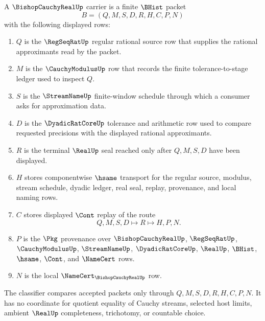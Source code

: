 \begin{definition}
\label{def:bishop-cauchy-real-carrier}
A $\BishopCauchyRealUp$ carrier is a finite $\BHist$ packet
$$
B=(Q,M,S,D,R,H,C,P,N)
$$
with the following displayed rows:
\begin{enumerate}
\item $Q$ is the $\RegSeqRatUp$ regular rational source row that supplies the rational approximants read by the packet.
\item $M$ is the $\CauchyModulusUp$ row that records the finite tolerance-to-stage ledger used to inspect $Q$.
\item $S$ is the $\StreamNameUp$ finite-window schedule through which a consumer asks for approximation data.
\item $D$ is the $\DyadicRatCoreUp$ tolerance and arithmetic row used to compare requested precisions with the displayed rational approximants.
\item $R$ is the terminal $\RealUp$ seal reached only after $Q,M,S,D$ have been displayed.
\item $H$ stores componentwise $\hsame$ transport for the regular source, modulus, stream schedule, dyadic ledger, real seal, replay, provenance, and local naming rows.
\item $C$ stores displayed $\Cont$ replay of the route
$$
Q,M,S,D \longmapsto R \longmapsto H,P,N .
$$
\item $P$ is the $\Pkg$ provenance over $\BishopCauchyRealUp$, $\RegSeqRatUp$, $\CauchyModulusUp$, $\StreamNameUp$, $\DyadicRatCoreUp$, $\RealUp$, $\BHist$, $\hsame$, $\Cont$, and $\NameCert$ rows.
\item $N$ is the local $\NameCert_{\BishopCauchyRealUp}$ row.
\end{enumerate}
The classifier compares accepted packets only through $Q,M,S,D,R,H,C,P,N$. It has no coordinate for quotient equality of Cauchy streams, selected host limits, ambient $\RealUp$ completeness, trichotomy, or countable choice.
\end{definition}

